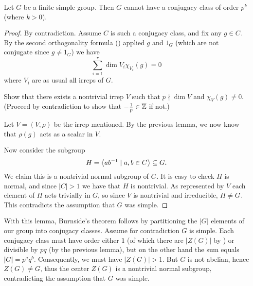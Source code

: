 \begin{lemma}
	Let $G$ be a finite simple group.
	Then $G$ cannot have a conjugacy class of order $p^k$ (where $k > 0$).
\end{lemma}
\begin{proof}
	By contradiction.
	Assume $C$ is such a conjugacy class, and fix any $g \in C$.
	By the second orthogonality formula ()
	applied $g$ and $1_G$ (which are not conjugate since $g \neq 1_G$) we have
	\[ \sum_{i=1}^r \dim V_i \chi_{V_i}(g) = 0 \]
	where $V_i$ are as usual all irreps of $G$.
	\begin{exercise}
		Show that there exists a nontrivial irrep $V$
		such that $p \nmid \dim V$ and $\chi_V(g) \neq 0$.
		(Proceed by contradiction to show that $-\frac1p \in \overline{\mathbb Z}$ if not.)
	\end{exercise}
	Let $V = (V, \rho)$ be the irrep mentioned.
	By the previous lemma, we now know that $\rho(g)$ acts as a scalar in $V$.

	Now consider the subgroup
	\[ H = \left< ab^{-1} \mid a,b \in C \right> \subseteq G. \]
	We claim this is a nontrivial normal subgroup of $G$.
	It is easy to check $H$ is normal,
	and since $|C| > 1$ we have that $H$ is nontrivial.
	As represented by $V$ each element of $H$ acts trivially in $G$,
	so since $V$ is nontrivial and irreducible, $H \neq G$.
	This contradicts the assumption that $G$ was simple.
\end{proof}

With this lemma, Burnside's theorem follows by partitioning
the $|G|$ elements of our group into conjugacy classes.
Assume for contradiction $G$ is simple.
Each conjugacy class must have order either $1$ (of which there are $|Z(G)|$ by )
or divisible by $pq$ (by the previous lemma), but on the other hand the sum equals $|G| = p^aq^b$.
Consequently, we must have $|Z(G)| > 1$.
But $G$ is not abelian, hence $Z(G) \neq G$,
thus the center $Z(G)$ is a nontrivial normal subgroup,
contradicting the assumption that $G$ was simple.



